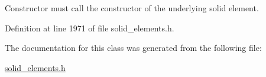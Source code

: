Constructor must call the constructor of the underlying solid element. 



Definition at line 1971 of file solid\+\_\+elements.\+h.



The documentation for this class was generated from the following file\+:\begin{DoxyCompactItemize}
\item 
\hyperlink{solid__elements_8h}{solid\+\_\+elements.\+h}\end{DoxyCompactItemize}
